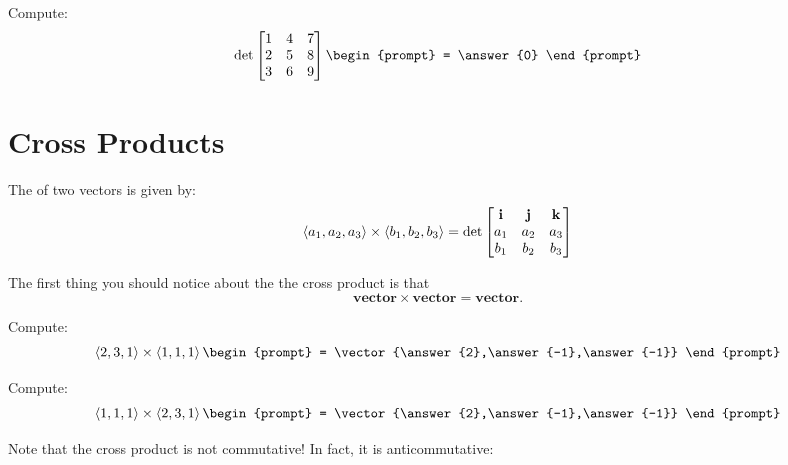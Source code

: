 \documentclass{ximera}
\begin{document}
\begin{question}
  Compute:
  \[
  \det
  \begin{bmatrix} 
    1 & 4 & 7\\
    2 & 5 & 8\\
    3 & 6 & 9\\
  \end{bmatrix}
  \begin{prompt}
    = \answer{0}
  \end{prompt}
  \]
\end{question}








\section{Cross Products}

\begin{definition}
  The  of two vectors is given by: 
  \[
  \left\langle a_1,a_2,a_3\right\rangle \times \left\langle b_1,b_2,b_3\right\rangle = \det
  \begin{bmatrix}
    \mathbf{i} & \mathbf{j} & \mathbf{k}\\
    a_1 & a_2 & a_3\\
    b_1 & b_2 & b_3
  \end{bmatrix}
  \]
\end{definition}		
The first thing you should notice about the the cross product is that
\[
\mathbf{vector}\times \mathbf{vector} = \mathbf{vector}.
\]
\begin{question}
  Compute:
  \[
  \vector{2,3,1} \times \vector{1,1,1}
  \begin{prompt}
    = \vector{\answer{2},\answer{-1},\answer{-1}}
  \end{prompt}
  \]
  \begin{question}
  Compute:
  \[
  \vector{1,1,1}\times\vector{2,3,1} 
  \begin{prompt}
    = \vector{\answer{2},\answer{-1},\answer{-1}}
  \end{prompt}
  \]
\end{question}
\end{question}

Note that the cross product is not commutative! In fact, it is
anticommutative:
\end{document}
